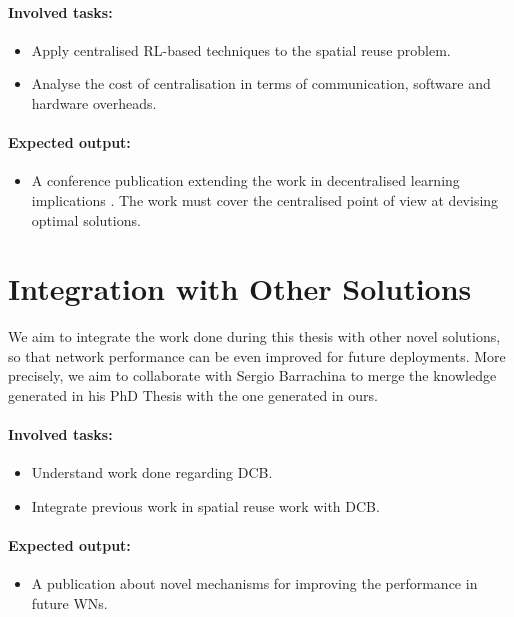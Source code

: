 \documentclass[12pt, a4paper,twoside]{tesi_upf}
\begin{document}
			\paragraph{Involved tasks:}		
			\begin{itemize}
				\item Apply centralised RL-based techniques to the spatial reuse problem.
				\item Analyse the cost of centralisation in terms of communication, software and hardware overheads.
			\end{itemize}	
			\paragraph{Expected output:}		
			\begin{itemize}
				\item A conference publication extending the work in decentralised learning implications \cite{wilhelmi2017implications, wilhelmi2017enhancing}. The work must cover the centralised point of view at devising optimal solutions.				
			\end{itemize}		
		
		\section{Integration with Other Solutions}
		\label{section:contribution5}
			We aim to integrate the work done during this thesis with other novel solutions, so that network performance can be even improved for future deployments. More precisely, we aim to collaborate with Sergio Barrachina to merge the knowledge generated in his PhD Thesis with the one generated in ours.	
			
			\paragraph{Involved tasks:}		
			\begin{itemize}
				\item Understand work done regarding DCB.
				\item Integrate previous work in spatial reuse work with DCB.			
			\end{itemize}	
			\paragraph{Expected output:}		
			\begin{itemize}
				\item A publication about novel mechanisms for improving the performance in future WNs.			
			\end{itemize}		
			
	
	
\end{document}
